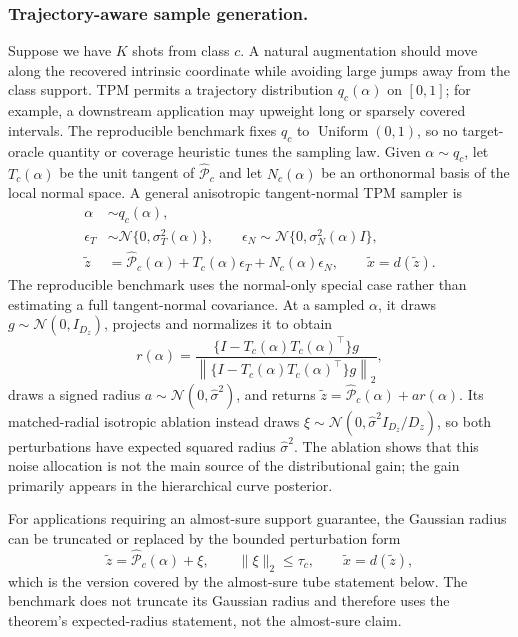 \documentclass{article}
\begin{document}
\subsubsection{Trajectory-aware sample generation.} 
Suppose we have $K$ shots from class $c$. A natural augmentation should move along the recovered intrinsic coordinate while avoiding large jumps away from the class support. TPM permits a trajectory distribution $q_c(\alpha)$ on $[0,1]$; for example, a downstream application may upweight long or sparsely covered intervals. The reproducible benchmark fixes $q_c$ to $\operatorname{Uniform}(0,1)$, so no target-oracle quantity or coverage heuristic tunes the sampling law. Given $\alpha\sim q_c$, let $T_c(\alpha)$ be the unit tangent of $\widehat{\mathcal{P}}_c$ and let $N_c(\alpha)$ be an orthonormal basis of the local normal space. A general anisotropic tangent-normal TPM sampler is
\begin{align}
	\alpha &\sim q_c(\alpha), \nonumber\\
	\epsilon_T &\sim \mathcal{N}\{0,\sigma_T^2(\alpha)\}, \qquad
	\epsilon_N \sim \mathcal{N}\{0,\sigma_N^2(\alpha)I\}, \nonumber\\
	\tilde z
	&=
	\widehat{\mathcal{P}}_c(\alpha)
	+
	T_c(\alpha)\epsilon_T
	+
	N_c(\alpha)\epsilon_N,
	\qquad
	\tilde x=d(\tilde z).
	\label{eq:anisotropic_tpm_sampler}
\end{align}
The reproducible benchmark uses the normal-only special case rather than estimating a full tangent-normal covariance. At a sampled $\alpha$, it draws $g\sim\mathcal N(0,I_{D_z})$, projects and normalizes it to obtain
\[
	r(\alpha)
	=
	\frac{\{I-T_c(\alpha)T_c(\alpha)^\top\}g}
	{\left\lVert\{I-T_c(\alpha)T_c(\alpha)^\top\}g\right\rVert_2},
\]
draws a signed radius $a\sim\mathcal N(0,\widehat\sigma^2)$, and returns $\tilde z=\widehat{\mathcal P}_c(\alpha)+a r(\alpha)$. Its matched-radial isotropic ablation instead draws $\xi\sim\mathcal N(0,\widehat\sigma^2 I_{D_z}/D_z)$, so both perturbations have expected squared radius $\widehat\sigma^2$. The ablation shows that this noise allocation is not the main source of the distributional gain; the gain primarily appears in the hierarchical curve posterior.

For applications requiring an almost-sure support guarantee, the Gaussian radius can be truncated or replaced by the bounded perturbation form
\[
	\tilde z=\widehat{\mathcal{P}}_c(\alpha)+\xi,
	\qquad
	\lVert \xi\rVert_2\le\tau_c,
	\qquad
	\tilde x=d(\tilde z),
\]
which is the version covered by the almost-sure tube statement below. The benchmark does not truncate its Gaussian radius and therefore uses the theorem's expected-radius statement, not the almost-sure claim.
\end{document}
